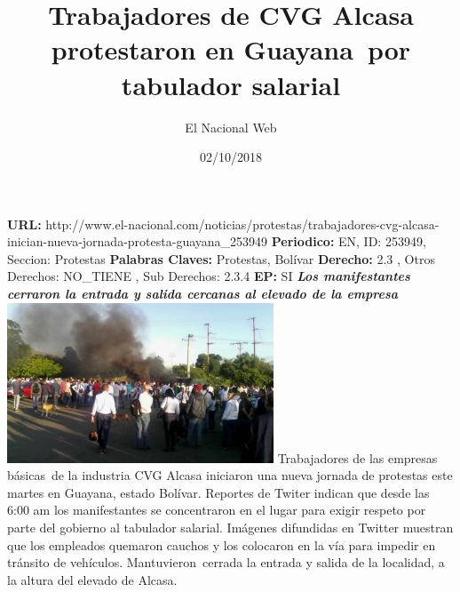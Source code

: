 \documentclass{article}%
\title{\textbf{Trabajadores de CVG Alcasa protestaron en Guayana~por tabulador salarial}}%
\author{El Nacional Web}%
\date{02/10/2018}%
\begin{document}
%
\normalsize%
\maketitle%
\textbf{URL: }%
http://www.el{-}nacional.com/noticias/protestas/trabajadores{-}cvg{-}alcasa{-}inician{-}nueva{-}jornada{-}protesta{-}guayana\_253949\newline%
%
\textbf{Periodico: }%
EN, %
ID: %
253949, %
Seccion: %
Protestas\newline%
%
\textbf{Palabras Claves: }%
Protestas, Bolívar\newline%
%
\textbf{Derecho: }%
2.3%
, Otros Derechos: %
NO\_TIENE%
, Sub Derechos: %
2.3.4%
\newline%
%
\textbf{EP: }%
SI\newline%
\newline%
%
\textbf{\textit{Los manifestantes cerraron la entrada y salida cercanas al elevado de la empresa}}%
\newline%
\newline%
%
\includegraphics[width=300px]{245.jpg}%
\newline%
%
Trabajadores de las empresas básicas~de la industria CVG Alcasa iniciaron una nueva jornada de protestas este martes en Guayana, estado Bolívar.%
\newline%
%
Reportes de Twiter indican que desde las 6:00 am los manifestantes se concentraron en el lugar para exigir respeto por parte del gobierno al tabulador salarial.%
\newline%
%
Imágenes difundidas en Twitter muestran que los empleados quemaron cauchos y los colocaron en la vía para impedir en tránsito de vehículos.%
\newline%
%
Mantuvieron~cerrada la entrada y salida de la localidad, a la altura del elevado de Alcasa.%
\newline%
%
\end{document}
